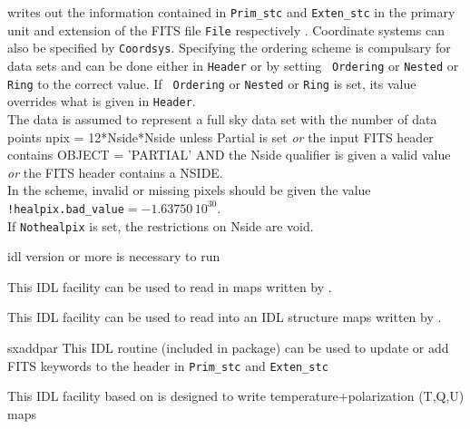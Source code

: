 \begin{codedescription}
{\parbox[t]{\hsize}{\facname{} writes out the information contained in {\tt{Prim\_stc}} and {\tt{Exten\_stc}} in the primary unit and extension of the FITS file
{\tt File} respectively . Coordinate systems can also be specified by {\tt Coordsys}. Specifying the
ordering scheme is compulsary for \healpix data sets and can be done either in {\tt Header} or by setting {\tt
Ordering} or {\tt Nested} or {\tt Ring} to the correct value. If {\tt
Ordering} or {\tt Nested} or {\tt Ring} is set, its value overrides what is
given in {\tt Header}. \\

The data is assumed to represent a full sky data set with 
the number of data points npix = 12*Nside*Nside
unless   \hfill\newline
Partial is set {\em or} the input FITS header contains OBJECT =
               'PARTIAL' \hfill\newline
       AND \hfill\newline
         the Nside qualifier is given a valid value {\em or} the FITS header contains
                 a NSIDE.\\

In the \healpix scheme, invalid or missing pixels should be given the value {\tt
!healpix.bad\_value}$= -1.63750\, 10^{30}$.\\

If {\tt Nothealpix} is set, the restrictions on Nside are void.}}
\end{codedescription}



\begin{related}
  \begin{sulist}{} %
  \item[idl] version \idlversion or more is necessary to run \thedocid
  \item[\htmlref{read\_fits\_map}{idl:read_fits_map}] This \healpix IDL facility can be used to read in maps
  written by \thedocid.
  \item[\htmlref{read\_fits\_s}{idl:read_fits_s}] This \healpix IDL facility can be used to read
  into an IDL structure maps written by \thedocid.
  \item[sxaddpar] This IDL routine (included in \healpix package) can be used to update
  or add FITS keywords to the header in {\tt Prim\_stc} and {\tt Exten\_stc}

  \item[\htmlref{write\_tqu}{idl:write_tqu}] This \healpix IDL facility based on \thedocid{} is designed to write
  temperature+polarization (T,Q,U) maps
  \end{sulist}
\end{related}


